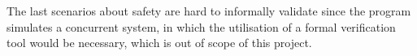 The last scenarios about safety are hard to informally validate since the program simulates a concurrent system, in which the utilisation of a formal verification tool would be necessary, which is out of scope of this project. %

    
